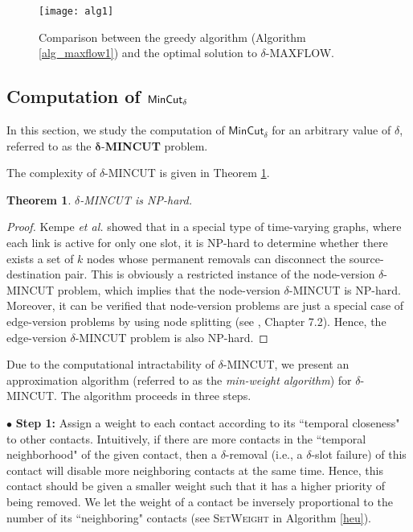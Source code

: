 \documentclass[10pt, conference, letterpaper]{IEEEtran}
\newtheorem{theorem}{Theorem}
\begin{document}
\begin{figure}[ht]
\begin{center}
\texttt{[image: alg1]}
\caption{Comparison between the greedy algorithm (Algorithm \ref{alg_maxflow1}) and the optimal solution to $\delta$-MAXFLOW.}
\label{gap_maxflow}\vspace{-3mm}
\end{center}
\end{figure}


\subsection{Computation of {$\mathlarger{\mathsf{MinCut_{\delta}}}$}}\label{com_mincut}
In this section, we study the computation of $\mathsf{MinCut_{\delta}}$ for an arbitrary value of $\delta$, referred to as the $\boldsymbol{\delta}$-\textbf{MINCUT} problem.

\noindent The complexity of $\delta$-MINCUT is given in Theorem \ref{mincut_hardness}.

\begin{theorem}\label{mincut_hardness}
$\delta$-MINCUT is NP-hard.
\end{theorem}
\begin{proof}
Kempe \emph{et al.} \cite{con} showed that in a special type of time-varying graphs, where each link is active for only one slot, it is NP-hard to determine whether there exists a set of $k$ nodes whose permanent removals can disconnect the source-destination pair. This is obviously a restricted instance of the node-version $\delta$-MINCUT problem, which implies that the node-version $\delta$-MINCUT is NP-hard. Moreover, it can be verified that node-version problems are just a special case of edge-version problems by using node splitting (see \cite{LP}, Chapter 7.2). Hence, the edge-version $\delta$-MINCUT problem is also NP-hard.
\end{proof}

Due to the computational intractability of $\delta$-MINCUT, we present an approximation algorithm  (referred to as the \emph{min-weight algorithm}) for $\delta$-MINCUT. The algorithm proceeds in three steps.

\vspace{1mm}

\noindent $\bullet$ \textbf{Step 1:} Assign a weight to each contact according to its ``temporal closeness" to other contacts. Intuitively, if there are more contacts in the ``temporal neighborhood" of the given contact, then a $\delta$-removal (i.e., a $\delta$-slot failure) of this contact will disable more neighboring contacts at the same time. Hence, this contact should be given a smaller weight such that it has a higher priority of being removed. We let the weight of a contact be inversely proportional to the number of its ``neighboring" contacts (see \textsc{SetWeight} in Algorithm \ref{heu}).
\end{document}

